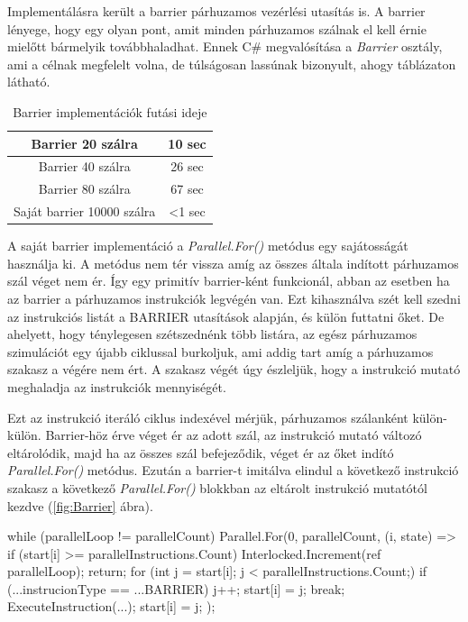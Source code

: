 Implementálásra került a barrier párhuzamos vezérlési utasítás is. A barrier lényege,  hogy egy olyan pont, amit minden párhuzamos szálnak el kell érnie mielőtt bármelyik továbbhaladhat. Ennek C\# megvalósítása a \textit{Barrier} osztály, ami a célnak megfelelt volna, de túlságosan lassúnak bizonyult, ahogy  táblázaton látható.



\begin{table}[h]
\centering
\caption{Barrier implementációk futási ideje}
\label{tab:barrier}
\begin{tabular}{|c|c|}
\hline
Barrier 20 szálra & 10 sec  \\
\hline
Barrier 40 szálra & 26 sec \\
\hline
Barrier 80 szálra & 67 sec \\
\hline 
Saját barrier 10000 szálra & <1 sec \\
\hline
\end{tabular}
\end{table}

A saját barrier implementáció a \textit{Parallel.For()} metódus egy sajátosságát használja ki. A metódus nem tér vissza amíg az összes általa indított párhuzamos szál véget nem ér. Így egy primitív barrier-ként funkcionál, abban az esetben ha az barrier a párhuzamos instrukciók legvégén van. Ezt kihasználva szét kell szedni az instrukciós listát a BARRIER utasítások alapján, és külön futtatni őket. De ahelyett, hogy ténylegesen szétszednénk több listára, az egész párhuzamos szimulációt egy újabb ciklussal burkoljuk, ami addig tart amíg a párhuzamos szakasz a végére nem ért. A szakasz végét úgy észleljük, hogy a instrukció mutató meghaladja az instrukciók mennyiségét. 

Ezt az instrukció iteráló ciklus indexével mérjük, párhuzamos szálanként külön-külön. Barrier-höz érve véget ér az adott szál, az instrukció mutató változó eltárolódik, majd ha az összes szál befejeződik, véget ér az őket indító \textit{Parallel.For()} metódus. Ezután a barrier-t imitálva elindul a következő instrukció szakasz a következő \textit{Parallel.For()} blokkban az eltárolt instrukció mutatótól kezdve (\ref{fig:Barrier} ábra). 



\begin{cpp}
while (parallelLoop != parallelCount)
{
    Parallel.For(0, parallelCount, (i, state) =>
    {
        if (start[i] >= parallelInstructions.Count)
        {
            Interlocked.Increment(ref parallelLoop);
            return;
        } 
        for (int j = start[i]; j < parallelInstructions.Count;)
        {
            if (...instrucionType == ...BARRIER)
            {
                j++;
                start[i] = j;
                break;
            }
            ExecuteInstruction(...);
            start[i] = j;
        }
    });
}
\end{cpp}


